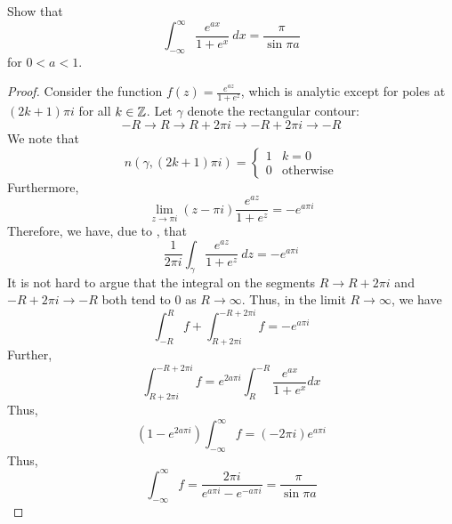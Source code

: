 \begin{example}
    Show that 
    \begin{equation*}
        \int_{-\infty}^\infty\frac{e^{ax}}{1 + e^x}~dx = \frac{\pi}{\sin\pi a}
    \end{equation*}
    for $0 < a < 1$.
\end{example}
\begin{proof}
    Consider the function $f(z) = \frac{e^{az}}{1 + e^z}$, which is analytic except for poles at $(2k + 1)\pi i$ for all $k\in\mathbb{Z}$. Let $\gamma$ denote the rectangular contour:
    \begin{equation*}
        -R\longrightarrow R\longrightarrow R + 2\pi i\longrightarrow -R + 2\pi i\longrightarrow -R
    \end{equation*}
    We note that 
    \begin{equation*}
        n(\gamma, (2k + 1)\pi i) = 
        \begin{cases}
            1 & k = 0\\
            0 & \text{otherwise}
        \end{cases}
    \end{equation*}
    Furthermore, 
    \begin{equation*}
        \lim_{z\to\pi i}(z - \pi i)\frac{e^{az}}{1 + e^z} = -e^{a\pi i}
    \end{equation*}
    Therefore, we have, due to , that 
    \begin{equation*}
        \frac{1}{2\pi i}\int_\gamma\frac{e^{az}}{1 + e^z}~dz = -e^{a\pi i}
    \end{equation*}
    It is not hard to argue that the integral on the segments $R\to R + 2\pi i$ and $-R + 2\pi i\to -R$ both tend to $0$ as $R\to\infty$. Thus, in the limit $R\to\infty$, we have 
    \begin{equation*}
        \int_{-R}^R f + \int_{R + 2\pi i}^{-R + 2\pi i} f = -e^{a\pi i}
    \end{equation*}
    Further, 
    \begin{equation*}
        \int_{R + 2\pi i}^{-R + 2\pi i } f = e^{2a\pi i}\int_{R}^{-R}\frac{e^{ax}}{1 + e^x}dx
    \end{equation*}
    Thus, 
    \begin{equation*}
        (1 - e^{2a\pi i})\int_{-\infty}^\infty f = (-2\pi i)e^{a\pi i}
    \end{equation*}
    Thus, 
    \begin{equation*}
        \int_{-\infty}^\infty f = \frac{2\pi i}{e^{a\pi i} - e^{-a\pi i}} = \frac{\pi}{\sin\pi a}
    \end{equation*}
\end{proof}

